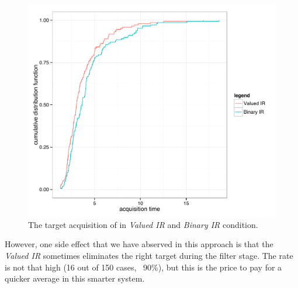 \begin{figure}[t]
\centering
\includegraphics[width=0.9\columnwidth]{figures/study2_time.pdf}
\caption{The target acquisition of in {\em Valued IR} and {\em Binary IR} condition.}
\label{fig:study2}
\end{figure}

However, one side effect that we have abserved in this approach is that the {\em Valued IR} sometimes eliminates the right target during the filter stage. The rate is not that high (16 out of 150 cases, ~90\%), but this is the price to pay for a quicker average in this smarter system.

